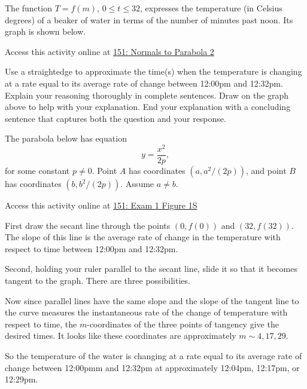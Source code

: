 \documentclass{ximera}
\begin{document}
\begin{question} \label{Qof3r}
The function $T=f(m)$, $0 \leq t \leq 32$, expresses the temperature (in Celsius degrees) of a beaker of water in terms of the number of minutes past noon. Its graph is shown below.

\begin{onlineOnly}
    \begin{center}
\end{center}
\end{onlineOnly}
Access this activity online at \href{https://www.desmos.com/calculator/ifsu6n6qt0}{151: Normals to Parabola 2}

Use a straightedge to approximate the time(s) when the temperature is changing at a rate equal to its average rate of change between 12:00pm and 12:32pm. Explain your reasoning thoroughly in complete sentences. Draw on the graph above to help with your explanation. End your explanation with a concluding sentence that captures both the question and your response.


The parabola below has equation 
\[
  y  = \frac{x^2}{2p} ,
\]
for some constant $p\neq 0$. Point $A$ has coordinates $(a,a^2/(2p))$, and point $B$ has coordinates $(b,b^2/(2p))$. 
Assume $a\neq b$.

\begin{onlineOnly}
    \begin{center}
\end{center}
\end{onlineOnly}
Access this activity online at \href{https://www.desmos.com/calculator/oczzppq2n4}{151: Exam 1 Figure 1S}

\begin{explanation}
First draw the secant line through the points $(0,f(0))$ and $(32,f(32))$. The slope of this line is the average rate of change in the temperature with respect to time between 12:00pm and 12:32pm.

Second, holding your ruler parallel to the secant line, slide it so that it becomes tangent to the graph. There are three possibilities.

Now since parallel lines have the same slope and the slope of the tangent line to the curve measures the instantaneous rate of the change of temperature with respect to time, the $m$-coordinates of the three points of tangency give the desired times. It looks like these coordinates are approximately $m\sim 4, 17, 29$.

So the temperature of the water is changing at a rate equal to its average rate of change between 12:00pmm and 12:32pm at approximately 12:04pm, 12:17pm, or 12:29pm. 


\end{explanation}
\end{question}
\end{document}
